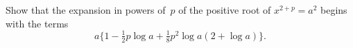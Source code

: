 Show that the expansion in powers of~$p$ of the positive root of
$x^{2+p} = a^{2}$ begins with the terms
\[
a\{1 - \tfrac{1}{2} p\log a + \tfrac{1}{8} p^{2}\log a (2 + \log a)\}.
\]

